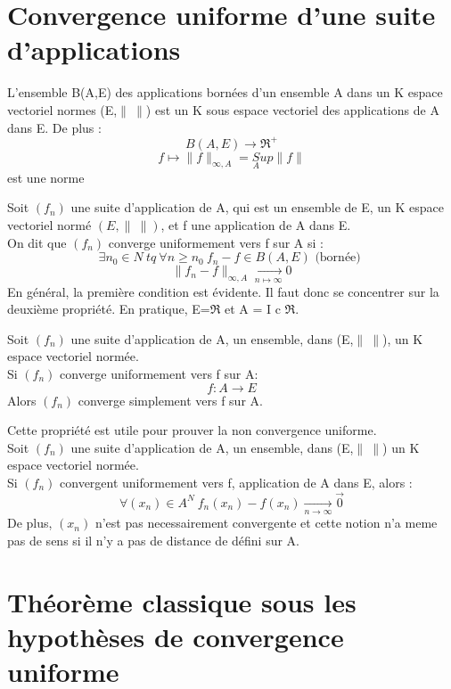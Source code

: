 \section{Convergence uniforme d'une suite d'applications}
\begin{prop}
L'ensemble B(A,E) des applications bornées d'un ensemble A dans un K espace vectoriel normes (E,$\parallel~\parallel$) est un K sous espace vectoriel des applications de A dans E. De plus : 
$$B(A,E) \rightarrow \Re^+$$
$$f \mapsto \parallel f\parallel_{\infty,A}=\underset{A}Sup\parallel f\parallel$$
est une norme 
\end{prop}
\begin{de}
Soit $(f_n)$ une suite d'application de A, qui est un ensemble de E, un K espace vectoriel normé $(E,\parallel~\parallel)$, et f une application de A dans E.\\
On dit que $(f_n)$ converge uniformement vers f sur A si :
$$\exists n_0 \in N~ tq~ \forall n\geq n_0~ f_n-f \in B(A,E) \mbox{ (bornée) }$$
$$\parallel f_n-f\parallel_{\infty,A}\underset{n\mapsto\infty}\rightarrow0$$
En général, la première condition est évidente. Il faut donc se concentrer sur la deuxième propriété. En pratique, E=$\Re$ et A = I c $\Re$.
\end{de}
\begin{prop}
Soit $(f_n)$ une suite d'application de A, un ensemble, dans (E,$\parallel~\parallel$), un K espace vectoriel normée.\\
Si $(f_n)$ converge uniformement vers f sur A:
$$f : A \rightarrow E$$
Alors $(f_n)$ converge simplement vers f sur A.
\end{prop}
\begin{prop}
Cette propriété est utile pour prouver la non convergence uniforme.\\
Soit $(f_n)$ une suite d'application de A, un ensemble, dans (E,$\parallel~\parallel$) un K espace vectoriel normée.\\
Si $(f_n)$ convergent uniformement vers f, application de A dans E, alors :
$$\forall (x_n) \in A^N~ f_n(x_n) - f(x_n) \underset{n \rightarrow \infty}\rightarrow \overrightarrow{0}$$
De plus, $(x_n)$ n'est pas necessairement convergente et cette notion n'a meme pas de sens si il n'y a pas de distance de défini sur A.
\end{prop}
\section{Théorème classique sous les hypothèses de convergence uniforme}
